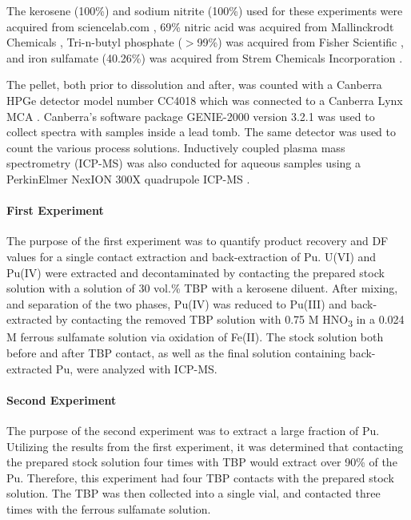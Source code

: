 \documentclass[review]{elsarticle}
\newcommand{\tsbs}{\textsubscript}
\begin{document}
The kerosene (100\%) and sodium nitrite (100\%) used for these experiments were acquired from
sciencelab.com \cite{sciencelab}, 69\% nitric acid was acquired from Mallinckrodt Chemicals \cite{mal}, Tri-n-butyl phosphate
($>$99\%) was acquired from Fisher Scientific \cite{fish}, and iron sulfamate (40.26\%) was acquired from Strem Chemicals
Incorporation \cite{strem}. 

The pellet, both prior to dissolution and after, was counted with a Canberra HPGe detector model
number CC4018 which was connected to a Canberra Lynx MCA \cite{hpge,lynx}. Canberra's software package GENIE-2000 version
3.2.1 \cite{version19952} was used to collect spectra with samples inside a lead tomb.
The same detector was used to count the various process solutions. 
Inductively coupled plasma mass spectrometry (ICP-MS) was also conducted for aqueous 
samples using a PerkinElmer NexION 300X quadrupole ICP-MS \cite{MS}.


\paragraph{First Experiment} The purpose of the first experiment was to quantify product
 recovery and DF values for a single contact extraction and back-extraction of Pu. 
U(VI) and Pu(IV) were extracted and decontaminated by contacting the prepared stock solution 
with a solution of 30 vol.\% TBP with a kerosene diluent. After mixing, and separation of the 
two phases, Pu(IV) was reduced to Pu(III) and back-extracted by contacting the removed TBP
solution with 0.75 M HNO\tsbs{3} in a 0.024 M ferrous sulfamate solution via oxidation of Fe(II).  
The stock solution both before and after TBP contact, as well as the final solution containing 
back-extracted Pu, were analyzed with ICP-MS. 
\paragraph{Second Experiment} The purpose of the second experiment was to extract a large fraction
 of Pu. Utilizing the results from the first experiment, it was determined that
 contacting the prepared stock solution four times with TBP would extract over 90\% of the Pu. 
 Therefore, this experiment had four TBP contacts with the prepared stock solution. The TBP was
 then collected into a single vial, and contacted three times with the ferrous sulfamate solution.
\end{document}
